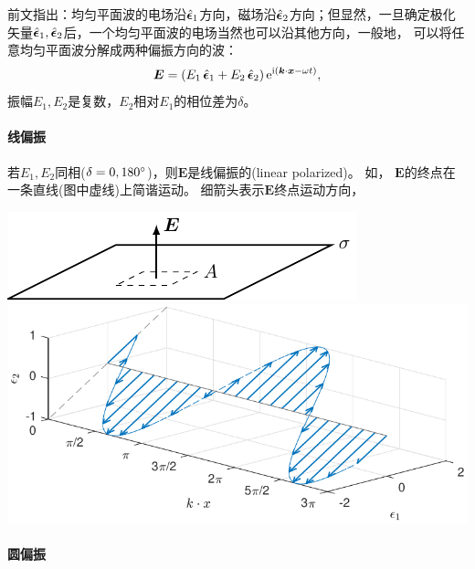 前文指出：均匀平面波的电场沿$\mathop{}\!\hat{\bm{\epsilon}}_1$方向，磁场沿$\mathop{}\!\hat{\bm{\epsilon}}_2$方向；但显然，一旦确定极化矢量$\mathop{}\!\hat{\bm{\epsilon}}_1,\mathop{}\!\hat{\bm{\epsilon}}_2$后，一个均匀平面波的电场当然也可以沿其他方向，一般地，
可以将任意均匀平面波分解成两种偏振方向的波：
\[
    \bm E=(E_1\mathop{}\!\hat{\bm{\epsilon}}_1+E_2\mathop{}\!\hat{\bm{\epsilon}}_2)\mathop{}\!\mathrm{e}^{\mathrm{i}(\bm k\cdot\bm x-\omega t)},
\]
振幅$E_1,E_2$是复数，$E_2$相对$E_1$的相位差为$\delta$。

\paragraph{线偏振}

若$E_1,E_2$同相($\mathop{}\!\delta=0,180^\circ$)，则$\bm E$是线偏振的(linear polarized)。%
如，
$\bm E$的终点在一条直线(图中虚线)上简谐运动。
细箭头表示$\bm E$终点运动方向，
\begin{center}
	\includegraphics[page=19]{figures/tikz/layouts.pdf}
    \includegraphics[width=0.5\linewidth]{figures/polarization_line.pdf}
    \label{fig:linear polarization}
\end{center}

\paragraph{圆偏振}

